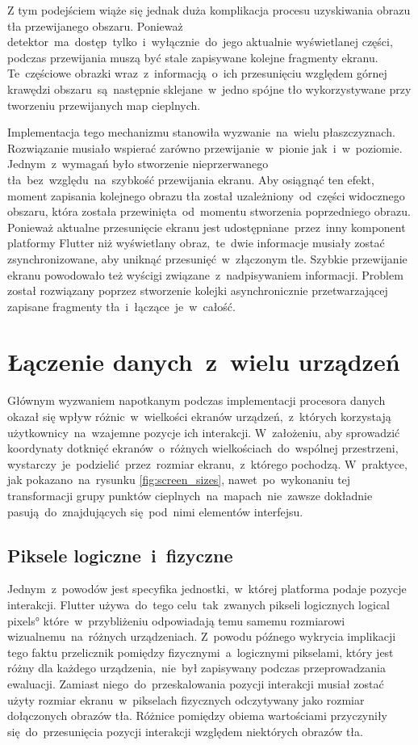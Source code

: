 Z tym podejściem wiąże się jednak duża komplikacja procesu uzyskiwania obrazu tła przewijanego obszaru. Ponieważ detektor~ma~dostęp~tylko~i~wyłącznie~do~jego aktualnie wyświetlanej części, podczas przewijania muszą być stale zapisywane kolejne fragmenty ekranu. Te~częściowe obrazki wraz~z~informacją~o~ich przesunięciu względem górnej krawędzi obszaru~są~następnie sklejane~w~jedno spójne tło wykorzystywane przy tworzeniu przewijanych map cieplnych.

Implementacja tego mechanizmu stanowiła wyzwanie~na~wielu płaszczyznach. Rozwiązanie musiało wspierać zarówno przewijanie~w~pionie jak~i~w~poziomie. Jednym~z~wymagań było stworzenie nieprzerwanego tła~bez~względu~na~szybkość przewijania ekranu. Aby osiągnąć ten efekt, moment zapisania kolejnego obrazu tła został uzależniony~od~części widocznego obszaru, która została przewinięta~od~momentu stworzenia poprzedniego obrazu. Ponieważ aktualne przesunięcie ekranu jest udostępniane~przez~inny komponent platformy Flutter niż wyświetlany obraz,~te~dwie informacje musiały zostać zsynchronizowane, aby uniknąć przesunięć~w~złączonym tle. Szybkie przewijanie ekranu powodowało też wyścigi związane~z~nadpisywaniem informacji. Problem został rozwiązany poprzez stworzenie kolejki asynchronicznie przetwarzającej zapisane fragmenty tła~i~łączące~je~w~całość.

\section{Łączenie danych~z~wielu urządzeń}
Głównym wyzwaniem napotkanym podczas implementacji procesora danych okazał się wpływ różnic~w~wielkości ekranów urządzeń,~z~których korzystają użytkownicy~na~wzajemne pozycje ich interakcji. W~założeniu, aby sprowadzić koordynaty dotknięć ekranów~o~różnych wielkościach~do~wspólnej przestrzeni, wystarczy~je~podzielić~przez~rozmiar ekranu,~z~którego pochodzą. W~praktyce, jak pokazano~na~rysunku \ref{fig:screen_sizes}, nawet~po~wykonaniu tej transformacji grupy punktów cieplnych~na~mapach~nie~zawsze dokładnie pasują~do~znajdujących się~pod~nimi elementów interfejsu. 

\subsection{Piksele logiczne~i~fizyczne}
Jednym~z~powodów jest specyfika jednostki,~w~której platforma podaje pozycje interakcji. Flutter używa~do~tego celu~tak~zwanych pikseli logicznych \ang{logical pixels} które~w~przybliżeniu odpowiadają temu samemu rozmiarowi wizualnemu~na~różnych urządzeniach. Z~powodu późnego wykrycia implikacji tego faktu przelicznik pomiędzy fizycznymi~a~logicznymi pikselami, który jest różny dla każdego urządzenia,~nie~był zapisywany podczas przeprowadzania ewaluacji. Zamiast niego~do~przeskalowania pozycji interakcji musiał zostać użyty rozmiar ekranu~w~pikselach fizycznych odczytywany jako rozmiar dołączonych obrazów tła. Różnice pomiędzy obiema wartościami przyczyniły się~do~przesunięcia pozycji interakcji względem niektórych obrazów tła.

